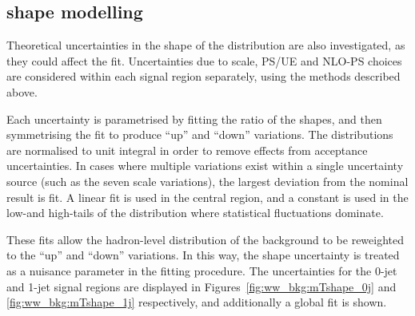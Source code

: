 \subsection{\mt shape modelling}
\label{sec:ww_bkg:mt}

Theoretical uncertainties in the shape of the \mt distribution are also investigated, 
as they could affect the fit. Uncertainties due to scale, PS/UE and NLO-PS choices are 
considered within each signal region separately, using the methods described above.

Each uncertainty is parametrised by fitting the ratio of the \mt shapes, and then 
symmetrising the fit to produce ``up'' and ``down'' variations. The \mt distributions are 
normalised to unit integral in order to remove effects from acceptance uncertainties. 
In cases where multiple variations exist within a single uncertainty source (such as the 
seven scale variations), the largest deviation from the nominal result is fit. A linear 
fit is used in the central \mt region, and a constant is used in the low-\mt and 
high-\mt tails of the distribution where statistical fluctuations dominate.

These fits allow the hadron-level \mt distribution of the \WW background to be reweighted 
to the ``up'' and ``down'' variations. In this way, the \mt shape uncertainty is treated 
as a nuisance parameter in the \HWW fitting procedure. The uncertainties for the 0-jet 
and 1-jet signal regions are displayed in Figures~\ref{fig:ww_bkg:mTshape_0j} and 
\ref{fig:ww_bkg:mTshape_1j} respectively, and additionally a global fit is shown.

